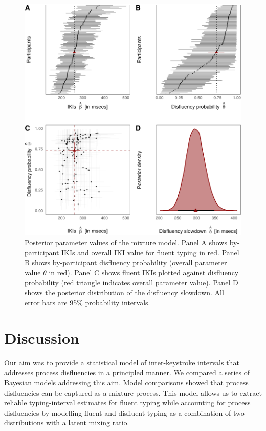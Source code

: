 \documentclass[english,jou,floatsintext]{apa7}
\begin{document}
\begin{figure}[!ht]

{\centering \includegraphics{report_files/figure-latex/parameters-1} 

}

\caption{Posterior parameter values of the mixture model. Panel A shows by-participant IKIs and overall IKI value for fluent typing in red. Panel B shows by-participant disfluency probability (overall parameter value $\theta$ in red). Panel C shows fluent IKIs plotted against disfluency probability (red triangle indicates overall parameter value). Panel D shows the posterior distribution of the disfluency slowdown. All error bars are 95\% probability intervals.}\label{fig:parameters}
\end{figure}

\hypertarget{discussion}{%
\section{Discussion}\label{discussion}}

Our aim was to provide a statistical model of inter-keystroke intervals that addresses process disfluencies in a principled manner. We compared a series of Bayesian models addressing this aim. Model comparisons showed that process disfluencies can be captured as a mixture process. This model allows us to extract reliable typing-interval estimates for fluent typing while accounting for process disfluencies by modelling fluent and disfluent typing as a combination of two distributions with a latent mixing ratio.
\end{document}
